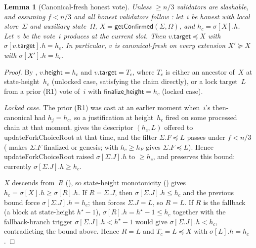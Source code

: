 \ifx\litemode\undefined\documentclass{article}\fi
\newcommand{\target}{\mathsf{target}}
\newcommand{\height}{\mathsf{height}}
\newcommand{\finalizeHeight}{\mathsf{finalize\_height}}
\newcommand{\updateForkChoiceRoot}{\textsf{updateForkChoiceRoot}\xspace}
\newcommand{\getConfirmed}{\textsf{getConfirmed}\xspace}
\theoremstyle{plain}
\newtheorem{lemma}{Lemma}
\theoremstyle{definition}
\theoremstyle{remark}
\begin{document}
\begin{lemma}[Canonical-fresh honest vote]\label{lem:canonical-fresh-honest-vote}
Unless $\geq n/3$ validators are slashable, and assuming $f < n/3$ and all honest validators follow : let~$i$ be honest with local store~$\Sigma$ and auxiliary state~$\Omega$, $X = \getConfirmed(\Sigma, \Omega)$, and $h_c = \sigma[X].h$.
Let~$v$ be the vote~$i$ produces at the current slot.
Then $v.\target \preceq X$ with $\sigma[v.\target].h = h_c$.
In particular, $v$ is canonical-fresh on every extension $X' \succeq X$ with $\sigma[X'].h = h_c$.
\end{lemma}

\begin{proof}
By , $v.\height = h_c$ and $v.\target = T_c$, where $T_c$ is either an ancestor of~$X$ at state-height~$h_c$ (unlocked case, satisfying the claim directly), or a lock target~$L$ from a prior (R1) vote of~$i$ with $\finalizeHeight = h_c$ (locked case).

\emph{Locked case.}
The prior (R1) was cast at an earlier moment when~$i$'s then-canonical had $h_j = h_c$, so a justification at height~$h_c$ fired on some processed chain at that moment.
 gives the descriptor $(h_c, L)$ offered to \updateForkChoiceRoot at that time, and the filter $\Sigma.F \preceq L$ passes under $f < n/3$ ( makes $\Sigma.F$ finalized or genesis;  with $h_c \geq h_{F}$ gives $\Sigma.F \preceq L$).
Hence \updateForkChoiceRoot raised $\sigma[\Sigma.J].h$ to $\geq h_c$, and  preserves this bound: currently $\sigma[\Sigma.J].h \geq h_c$.

$X$ descends from~$R$ (), so state-height monotonicity () gives $h_c = \sigma[X].h \geq \sigma[R].h$.
If $R = \Sigma.J$, then $\sigma[\Sigma.J].h \leq h_c$ and the previous bound force $\sigma[\Sigma.J].h = h_c$;  then forces $\Sigma.J = L$, so $R = L$.
If $R$ is the fallback (a block at state-height $h^\star - 1$), $\sigma[R].h = h^\star - 1 \leq h_c$ together with the fallback-branch trigger $\sigma[\Sigma.J].h < h^\star - 1$ would give $\sigma[\Sigma.J].h < h_c$, contradicting the bound above.
Hence $R = L$ and $T_c = L \preceq X$ with $\sigma[L].h = h_c$.
\end{proof}
\end{document}
